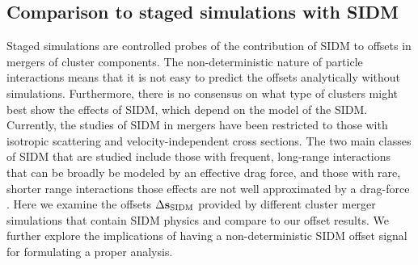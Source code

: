 \subsection{Comparison to staged simulations with SIDM}
\label{subsec:SIDM_sim}
Staged simulations are controlled probes of the contribution
of SIDM to offsets in mergers of cluster components. 
The non-deterministic nature of particle interactions means that it is not easy
to predict the offsets analytically without simulations.
Furthermore, there is no consensus on what type of clusters might best show the
effects of SIDM, which depend on the model of the SIDM.
Currently, the studies of SIDM in mergers have been restricted to those with isotropic
scattering and velocity-independent cross sections.   
The two main classes of SIDM that are studied include those with 
frequent, long-range interactions that can be broadly be modeled by an
effective drag force, and those with rare, shorter range interactions those
effects are not well approximated by a drag-force \citep{Kahlhoefer14}. 
Here we examine the offsets $\Delta {\bf s}_{\rm SIDM}$ provided by different cluster merger 
simulations that contain SIDM physics and compare to our offset results. 
We further explore the implications of having a non-deterministic SIDM offset signal for
formulating a proper analysis. 

